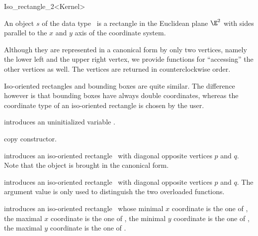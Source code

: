 \begin{ccRefClass} {Iso_rectangle_2<Kernel>}

\ccDefinition  An object $s$ of the data type \ccRefName\ is a
rectangle in the Euclidean plane $\E^2$ with sides parallel to the $x$ and
$y$ axis of the coordinate system.
 
Although they are represented in a canonical form by only two
vertices, namely the lower left and the upper right vertex, we provide
functions for ``accessing'' the other vertices as well. The vertices
are returned in counterclockwise order.

Iso-oriented rectangles and bounding boxes are quite similar. The
difference however is that bounding boxes have always double coordinates, 
whereas the coordinate type of an iso-oriented rectangle is chosen by
the user.

\ccCreation
{}


\ccHidden {}
             {introduces an uninitialized variable \ccVar.}

\ccHidden {}
            {copy constructor.}

            {introduces an iso-oriented rectangle \ccVar\ with diagonal
             opposite vertices $p$ and $q$. Note that the object is 
             brought in the canonical form.}

            {introduces an iso-oriented rectangle \ccVar\ with diagonal
             opposite vertices $p$ and $q$.  The  argument value
             is only used to distinguish the two overloaded functions.
             }


            {introduces an iso-oriented rectangle \ccVar\ whose
             minimal $x$ coordinate is the one of , the
             maximal $x$ coordinate is the one of , the
             minimal $y$ coordinate is the one of , the
             maximal $y$ coordinate is the one of .}


\end{ccRefClass}
